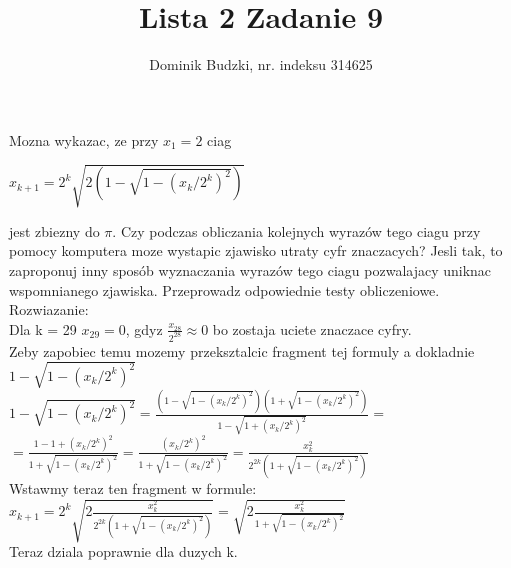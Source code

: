 \documentclass{article}
\title{Lista 2 Zadanie 9}
\author{Dominik Budzki, nr. indeksu 314625}
\begin{document}
\maketitle

Mozna wykazac, ze przy $x_1 = 2$ ciag\\

\begin{center}
    $x_{k+1} = 2^k\sqrt{2(1 - \sqrt{1 - (x_k/2^k)^2})}$
\end{center}

jest zbiezny do $\pi$. Czy podczas obliczania kolejnych wyrazów tego ciagu przy pomocy
komputera moze wystapic zjawisko utraty cyfr znaczacych? Jesli tak, to zaproponuj
inny sposób wyznaczania wyrazów tego ciagu pozwalajacy uniknac wspomnianego zjawiska.
Przeprowadz odpowiednie testy obliczeniowe.\\

Rozwiazanie:\\
Dla k = 29 $x_{29} = 0$, gdyz $\frac{x_{28}}{2^{28}} \approx 0$ bo zostaja uciete znaczace cyfry.\\
Zeby zapobiec temu mozemy przeksztalcic fragment tej formuly a dokladnie $1 - \sqrt{1 - (x_k/2^k)^2}$\\

$1 - \sqrt{1 - (x_k/2^k)^2} = \frac{(1 - \sqrt{1 - (x_k/2^k)^2})(1 + \sqrt{1 - (x_k/2^k)^2})}{1 - \sqrt{1 + (x_k/2^k)^2}} = $\\
$ = \frac{1 - 1 + (x_k/2^k)^2}{1 + \sqrt{1 - (x_k/2^k)^2}} =  \frac{(x_k/2^k)^2}{1 + \sqrt{1 - (x_k/2^k)^2}} = \frac{x_k^2}{2^{2k}(1 + \sqrt{1 - (x_k/2^k)^2})}$\\

Wstawmy teraz ten fragment w formule: \\
$x_{k+1} = 2^k\sqrt{2\frac{x_k^2}{2^{2k}(1 + \sqrt{1 - (x_k/2^k)^2})}} = \sqrt{2\frac{x_k^2}{1 + \sqrt{1 - (x_k/2^k)^2}}}$\\

Teraz dziala poprawnie dla duzych k.
\end{document}
